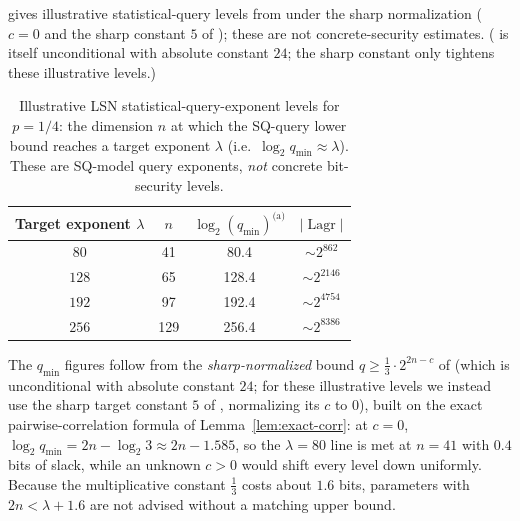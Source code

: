 \documentclass[11pt,a4paper]{article}
\theoremstyle{plain}
\theoremstyle{definition}
\DeclareMathOperator{\Lagr}{Lagr}
\begin{document}
 gives illustrative statistical-query levels from  under the sharp normalization ($c=0$ and the sharp constant $5$ of ); these are not concrete-security estimates. ( is itself unconditional with absolute constant $24$; the sharp constant only tightens these illustrative levels.)

\begin{table}[ht]
\centering
\caption{Illustrative LSN statistical-query-exponent levels for $p=1/4$: the dimension $n$ at which the SQ-query lower bound reaches a target exponent $\lambda$ (i.e.\ $\log_2 q_{\min}\approx\lambda$). These are SQ-model query exponents, \emph{not} concrete bit-security levels.}
\label{tab:parameters}
\begin{tabular}{@{}cccc@{}}
\hline
Target exponent $\lambda$ & $n$ & $\log_2(q_{\min})^{\text{(a)}}$ & $|\Lagr|$ \\
\hline
$80$  & 41  & 80.4  & $\sim 2^{862}$  \\
$128$ & 65  & 128.4 & $\sim 2^{2146}$ \\
$192$ & 97  & 192.4 & $\sim 2^{4754}$ \\
$256$ & 129 & 256.4 & $\sim 2^{8386}$ \\
\hline
\end{tabular}
\vspace{4pt}
\end{table}

The $q_{\min}$ figures follow from the \emph{sharp-normalized} bound $q \ge \tfrac13 \cdot 2^{2n-c}$ of  (which is unconditional with absolute constant $24$; for these illustrative levels we instead use the sharp target constant $5$ of , normalizing its $c$ to $0$), built on the exact pairwise-correlation formula of Lemma~\ref{lem:exact-corr}: at $c=0$, $\log_2 q_{\min} = 2n - \log_2 3 \approx 2n - 1.585$, so the $\lambda=80$ line is met at $n=41$ with $0.4$ bits of slack, while an unknown $c>0$ would shift every level down uniformly. Because the multiplicative constant $\tfrac13$ costs about $1.6$ bits, parameters with $2n < \lambda + 1.6$ are not advised without a matching upper bound.
\end{document}
